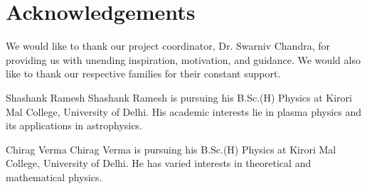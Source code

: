 \documentclass[journal]{IEEEtran}
\begin{document}
\ifCLASSOPTIONcaptionsoff
  \newpage
\fi

\section{Acknowledgements}
We would like to thank our project coordinator, Dr. Swarniv Chandra, for providing us with unending inspiration, motivation, and guidance. We would also like to thank our respective families for their constant support.




\vfill
\begin{IEEEbiography}{Shashank Ramesh}
Shashank Ramesh is pursuing his B.Sc.(H) Physics at Kirori Mal College, University of Delhi. His academic interests lie in plasma physics and its applications in astrophysics.
\end{IEEEbiography} 
\vfill
\begin{IEEEbiography}{Chirag Verma}
Chirag Verma is pursuing his B.Sc.(H) Physics at Kirori Mal College, University of Delhi. He has varied interests in theoretical and mathematical physics.
\end{IEEEbiography}
\vfill \vfill \vfill \vfill \vfill \vfill \vfill \vfill \vfill \vfill \vfill \vfill 
\vfill \vfill \vfill \vfill \vfill \vfill \vfill \vfill \vfill \vfill \vfill \vfill \vfill \vfill \vfill \vfill \vfill \vfill \vfill \vfill \vfill \vfill \vfill \vfill \vfill \vfill \vfill \vfill

 
\end{document}
